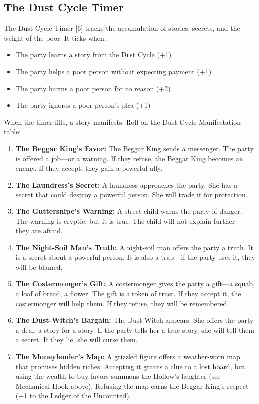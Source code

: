 \documentclass[11pt]{article}
\begin{document}
\subsection{The Dust Cycle Timer}
The Dust Cycle Timer [6] tracks the accumulation of stories, secrets, and the weight of the poor. It ticks when:

\begin{itemize}
\item The party learns a story from the Dust Cycle (+1)
\item The party helps a poor person without expecting payment (+1)
\item The party harms a poor person for no reason (+2)
\item The party ignores a poor person's plea (+1)
\end{itemize}

When the timer fills, a story manifests. Roll on the Dust Cycle Manifestation table:

\begin{enumerate}
\item \textbf{The Beggar King's Favor:} The Beggar King sends a messenger. The party is offered a job—or a warning. If they refuse, the Beggar King becomes an enemy. If they accept, they gain a powerful ally.
\item \textbf{The Laundress's Secret:} A laundress approaches the party. She has a secret that could destroy a powerful person. She will trade it for protection.
\item \textbf{The Guttersnipe's Warning:} A street child warns the party of danger. The warning is cryptic, but it is true. The child will not explain further—they are afraid.
\item \textbf{The Night‑Soil Man's Truth:} A night‑soil man offers the party a truth. It is a secret about a powerful person. It is also a trap—if the party uses it, they will be blamed.
\item \textbf{The Costermonger's Gift:} A costermonger gives the party a gift—a squab, a loaf of bread, a flower. The gift is a token of trust. If they accept it, the costermonger will help them. If they refuse, they will be remembered.
\item \textbf{The Dust‑Witch's Bargain:} The Dust‑Witch appears. She offers the party a deal: a story for a story. If the party tells her a true story, she will tell them a secret. If they lie, she will curse them.
\item \textbf{The Moneylender's Map:} A grizzled figure offers a weather‑worn map that promises hidden riches. Accepting it grants a clue to a lost hoard, but using the wealth to buy favors summons the Hollow’s laughter (see Mechanical Hook above). Refusing the map earns the Beggar King’s respect (+1 to the Ledger of the Uncounted).
\end{enumerate}
\end{document}
